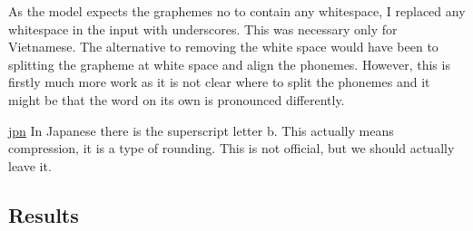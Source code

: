As the model expects the graphemes no to contain any whitespace, I replaced any whitespace in the input with underscores. This was necessary only for Vietnamese. The alternative to removing the white space would have been to splitting the grapheme at white space and align the phonemes. However, this is firstly much more work as it is not clear where to split the phonemes and it might be that the word on its own is pronounced differently. 

\href{https://en.wikipedia.org/wiki/Roundedness}{jpn} In Japanese there is the superscript letter b. This actually means compression, it is a type of rounding. This is not official, but we should actually leave it. 

\subsection{Results}





